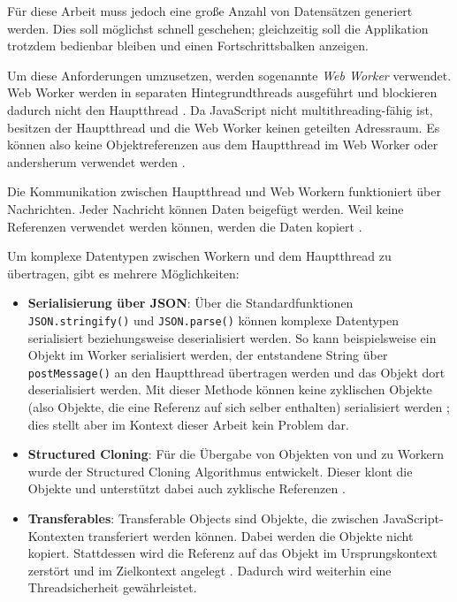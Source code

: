 Für diese Arbeit muss jedoch eine große Anzahl von Datensätzen generiert werden. Dies soll möglichst schnell geschehen; gleichzeitig soll die Applikation trotzdem bedienbar bleiben und einen Fortschrittsbalken anzeigen.

Um diese Anforderungen umzusetzen, werden sogenannte \textit{Web Worker} verwendet. Web Worker werden in separaten Hintegrundthreads ausgeführt und blockieren dadurch nicht den Hauptthread \cite{mdn:webworkers}. Da JavaScript nicht multithreading-fähig ist, besitzen der Hauptthread und die Web Worker keinen geteilten Adressraum. Es können also keine Objektreferenzen aus dem Hauptthread im Web Worker oder andersherum verwendet werden \cite{mdn:webworkers}.

Die Kommunikation zwischen Hauptthread und Web Workern funktioniert über Nachrichten. Jeder Nachricht können Daten beigefügt werden. Weil keine Referenzen verwendet werden können, werden die Daten kopiert \cite{mdn:webworkers}.

Um komplexe Datentypen zwischen Workern und dem Hauptthread zu übertragen, gibt es mehrere Möglichkeiten:
\begin{itemize}
    \item \textbf{Serialisierung über JSON}: Über die Standardfunktionen \texttt{JSON.stringify()} und \texttt{JSON.parse()} können komplexe Datentypen serialisiert beziehungsweise deserialisiert werden. So kann beispielsweise ein Objekt im Worker serialisiert werden, der entstandene String über \texttt{postMessage()} an den Hauptthread übertragen werden und das Objekt dort deserialisiert werden. Mit dieser Methode können keine zyklischen Objekte (also Objekte, die eine Referenz auf sich selber enthalten) serialisiert werden \cite{mdn:json_stringify}; dies stellt aber im Kontext dieser Arbeit kein Problem dar.
    \item \textbf{Structured Cloning}: Für die Übergabe von Objekten von und zu Workern wurde der Structured Cloning Algorithmus entwickelt. Dieser klont die Objekte und unterstützt dabei auch zyklische Referenzen \cite{mdn:structured_cloning}.
    \item \textbf{Transferables}: Transferable Objects sind Objekte, die zwischen JavaScript-Kon\-texten transferiert werden können. Dabei werden die Objekte nicht kopiert. Stattdessen wird die Referenz auf das Objekt im Ursprungskontext zerstört und im Zielkontext angelegt \cite{googledev:transferables}. Dadurch wird weiterhin eine Threadsicherheit gewährleistet.
\end{itemize}

